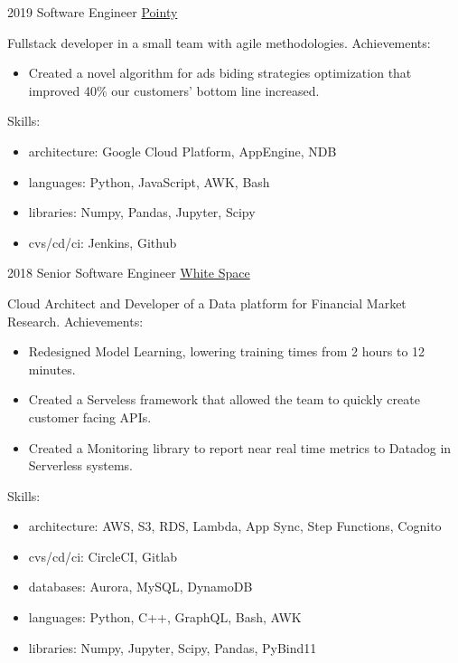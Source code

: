 \documentclass[11pt,a4paper]{moderncv}
\begin{document}
    \cventry
        {2019}
        {Software Engineer}
        {\href{https://www.pointy.com}{Pointy}} {} {}
        {
            Fullstack developer in a small team with agile methodologies.
            Achievements:
            \begin{itemize}
                \item Created a novel algorithm for ads biding strategies
                      optimization that improved 40\% our customers'
                      bottom line increased.
            \end{itemize}
            Skills:
            \begin{itemize}
                \item architecture: Google Cloud Platform, AppEngine, NDB
                \item languages: Python, JavaScript, AWK, Bash
                \item libraries: Numpy, Pandas, Jupyter, Scipy
                \item cvs/cd/ci: Jenkins, Github
            \end{itemize}
        }

    \cventry
        {2018}
        {Senior Software Engineer}
        {\href{https://www.white.space}{White Space}} {} {}
        {
            Cloud Architect and Developer of a Data platform for Financial Market Research.
            Achievements:
            \begin{itemize}
                \item Redesigned Model Learning, lowering training times from 2
                      hours to 12 minutes.
                \item Created a Serveless framework that allowed the team to
                      quickly create customer facing APIs.
                \item Created a Monitoring library to report near real time
                      metrics to Datadog in Serverless systems.
            \end{itemize}
            Skills:
            \begin{itemize}
                \item architecture: AWS, S3, RDS, Lambda, App Sync, Step Functions, Cognito
                \item cvs/cd/ci: CircleCI, Gitlab
                \item databases: Aurora, MySQL, DynamoDB
                \item languages: Python, C++, GraphQL, Bash, AWK
                \item libraries: Numpy, Jupyter, Scipy, Pandas, PyBind11
            \end{itemize}
        }
\end{document}
